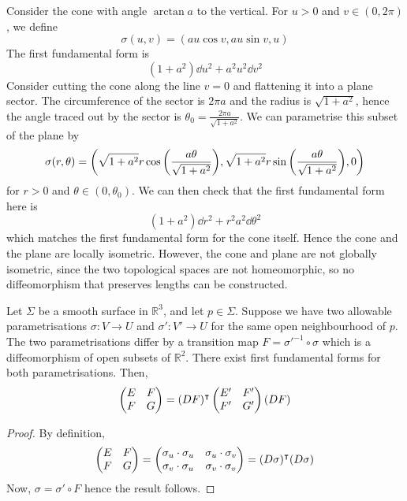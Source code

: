 \begin{example}
	Consider the cone with angle \( \arctan a \) to the vertical.
	For \( u > 0 \) and \( v \in (0,2\pi) \), we define
	\[ \sigma(u,v) = (au\cos v, au\sin v, u) \]
	The first fundamental form is
	\[ (1+a^2)\dd{u}^2 + a^2 u^2 \dd{v}^2 \]
	Consider cutting the cone along the line \( v = 0 \) and flattening it into a plane sector.
	The circumference of the sector is \( 2 \pi a \) and the radius is \( \sqrt{1+a^2} \), hence the angle traced out by the sector is \( \theta_0 = \frac{2 \pi a}{\sqrt{1+a^2}} \).
	We can parametrise this subset of the plane by
	\[ \sigma(r,\theta) = \qty(\sqrt{1+a^2} r\cos\qty(\frac{a\theta}{\sqrt{1+a^2}}), \sqrt{1+a^2} r\sin\qty(\frac{a\theta}{\sqrt{1+a^2}}), 0) \]
	for \( r > 0 \) and \( \theta \in (0,\theta_0) \).
	We can then check that the first fundamental form here is
	\[ (1+a^2) \dd{r}^2 + r^2 a^2 \dd{\theta}^2 \]
	which matches the first fundamental form for the cone itself.
	Hence the cone and the plane are locally isometric.
	However, the cone and plane are not globally isometric, since the two topological spaces are not homeomorphic, so no diffeomorphism that preserves lengths can be constructed.
\end{example}
\begin{lemma}
	Let \( \Sigma \) be a smooth surface in \( \mathbb R^3 \), and let \( p \in \Sigma \).
	Suppose we have two allowable parametrisations \( \sigma \colon V \to U \) and \( \sigma' \colon V' \to U \) for the same open neighbourhood of \( p \).
	The two parametrisations differ by a transition map \( F = {\sigma'}^{-1} \circ \sigma \) which is a diffeomorphism of open subsets of \( \mathbb R^2 \).
	There exist first fundamental forms for both parametrisations.
	Then,
	\[ \begin{pmatrix}
		E & F \\
		F & G
	\end{pmatrix} = (DF)^\intercal \begin{pmatrix}
		E' & F' \\
		F' & G'
	\end{pmatrix} (DF) \]
\end{lemma}
\begin{proof}
	By definition,
	\[ \begin{pmatrix}
		E & F \\
		F & G
	\end{pmatrix} = \begin{pmatrix}
		\sigma_u \cdot \sigma_u & \sigma_u \cdot \sigma_v \\
		\sigma_v \cdot \sigma_u & \sigma_v \cdot \sigma_v
	\end{pmatrix} = (D\sigma)^\intercal (D\sigma) \]
	Now, \( \sigma = \sigma' \circ F \) hence the result follows.
\end{proof}
